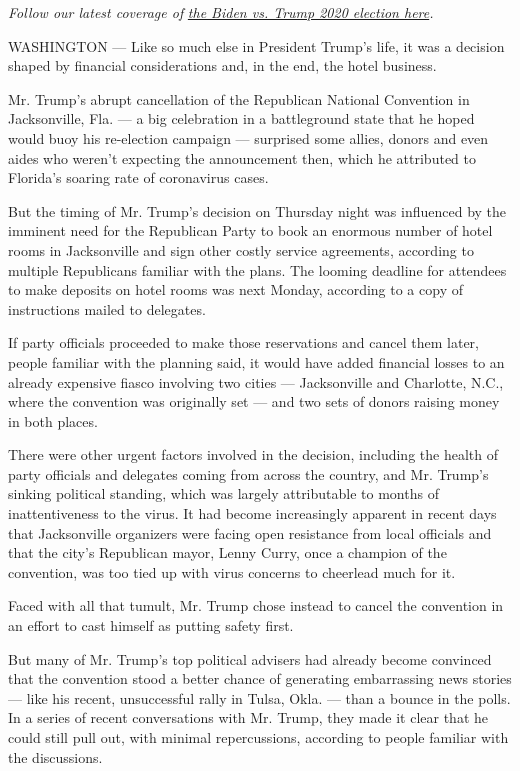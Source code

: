 \emph{Follow our latest coverage of}
\href{https://www.nytimes.com/2020/07/31/us/elections/biden-vs-trump.html}{\emph{the
Biden vs. Trump 2020 election here}}\emph{.}

WASHINGTON --- Like so much else in President Trump's life, it was a
decision shaped by financial considerations and, in the end, the hotel
business.

Mr. Trump's abrupt cancellation of the Republican National Convention in
Jacksonville, Fla. --- a big celebration in a battleground state that he
hoped would buoy his re-election campaign --- surprised some allies,
donors and even aides who weren't expecting the announcement then, which
he attributed to Florida's soaring rate of coronavirus cases.

But the timing of Mr. Trump's decision on Thursday night was influenced
by the imminent need for the Republican Party to book an enormous number
of hotel rooms in Jacksonville and sign other costly service agreements,
according to multiple Republicans familiar with the plans. The looming
deadline for attendees to make deposits on hotel rooms was next Monday,
according to a copy of instructions mailed to delegates.

If party officials proceeded to make those reservations and cancel them
later, people familiar with the planning said, it would have added
financial losses to an already expensive fiasco involving two cities ---
Jacksonville and Charlotte, N.C., where the convention was originally
set --- and two sets of donors raising money in both places.

There were other urgent factors involved in the decision, including the
health of party officials and delegates coming from across the country,
and Mr. Trump's sinking political standing, which was largely
attributable to months of inattentiveness to the virus. It had become
increasingly apparent in recent days that Jacksonville organizers were
facing open resistance from local officials and that the city's
Republican mayor, Lenny Curry, once a champion of the convention, was
too tied up with virus concerns to cheerlead much for it.

Faced with all that tumult, Mr. Trump chose instead to cancel the
convention in an effort to cast himself as putting safety first.

But many of Mr. Trump's top political advisers had already become
convinced that the convention stood a better chance of generating
embarrassing news stories --- like his recent, unsuccessful rally in
Tulsa, Okla. --- than a bounce in the polls. In a series of recent
conversations with Mr. Trump, they made it clear that he could still
pull out, with minimal repercussions, according to people familiar with
the discussions.

